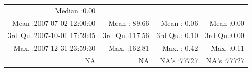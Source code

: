 \documentclass[
  10pt,
  a4paper,oneside]{article}
\begin{document}
\begin{longtable}[]{@{}rrrr@{}}
\begin{minipage}[t]{0.18\columnwidth}
Median :0.00\strut
\end{minipage}\tabularnewline
\begin{minipage}[t]{0.34\columnwidth}\raggedleft
Mean :2007-07-02 12:00:00\strut
\end{minipage} & \begin{minipage}[t]{0.19\columnwidth}\raggedleft
Mean : 89.66\strut
\end{minipage} & \begin{minipage}[t]{0.18\columnwidth}\raggedleft
Mean : 0.06\strut
\end{minipage} & \begin{minipage}[t]{0.18\columnwidth}\raggedleft
Mean :0.00\strut
\end{minipage}\tabularnewline
\begin{minipage}[t]{0.34\columnwidth}\raggedleft
3rd Qu.:2007-10-01 17:59:45\strut
\end{minipage} & \begin{minipage}[t]{0.19\columnwidth}\raggedleft
3rd Qu.:117.56\strut
\end{minipage} & \begin{minipage}[t]{0.18\columnwidth}\raggedleft
3rd Qu.: 0.10\strut
\end{minipage} & \begin{minipage}[t]{0.18\columnwidth}\raggedleft
3rd Qu.:0.00\strut
\end{minipage}\tabularnewline
\begin{minipage}[t]{0.34\columnwidth}\raggedleft
Max. :2007-12-31 23:59:30\strut
\end{minipage} & \begin{minipage}[t]{0.19\columnwidth}\raggedleft
Max. :162.81\strut
\end{minipage} & \begin{minipage}[t]{0.18\columnwidth}\raggedleft
Max. : 0.42\strut
\end{minipage} & \begin{minipage}[t]{0.18\columnwidth}\raggedleft
Max. :0.11\strut
\end{minipage}\tabularnewline
\begin{minipage}[t]{0.34\columnwidth}\raggedleft
NA\strut
\end{minipage} & \begin{minipage}[t]{0.19\columnwidth}\raggedleft
NA\strut
\end{minipage} & \begin{minipage}[t]{0.18\columnwidth}\raggedleft
NA's :77727\strut
\end{minipage} & \begin{minipage}[t]{0.18\columnwidth}\raggedleft
NA's :77727\strut
\end{minipage}\tabularnewline
\bottomrule
\end{longtable}
\end{document}
